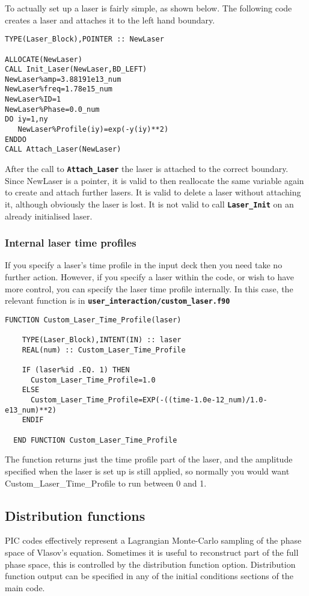 \documentclass[12pt]{article}
\newcommand{\simpleboxverbatim}{\begin{Verbatim}[obeytabs=true,frame=single,
  framerule=0.5mm,rulecolor=\color{warwickmid}]}
\newcommand{\inlinecode}[1]{{\color{warwickred} \bf\texttt{#1}}}
\begin{document}
To actually set up a laser is fairly simple, as shown below. The following
code creates a laser and attaches it to the left hand boundary.
\simpleboxverbatim
TYPE(Laser_Block),POINTER :: NewLaser

ALLOCATE(NewLaser)
CALL Init_Laser(NewLaser,BD_LEFT)
NewLaser%amp=3.88191e13_num
NewLaser%freq=1.78e15_num
NewLaser%ID=1
NewLaser%Phase=0.0_num
DO iy=1,ny
   NewLaser%Profile(iy)=exp(-y(iy)**2)
ENDDO
CALL Attach_Laser(NewLaser)
\end{Verbatim}
After the call to \inlinecode{Attach\_Laser} the laser is attached to the
correct boundary. Since NewLaser is a pointer, it is valid to then reallocate
the same variable again to create and attach further lasers. It is valid to
delete a laser without attaching it, although obviously the laser is lost. It
is not valid to call \inlinecode{Laser\_Init} on an already initialised laser.

\subsubsection{Internal laser time profiles}
If you specify a laser's time profile in the input deck then you need take no
further action. However, if you specify a laser within the code, or wish to
have more control, you can specify the laser time profile internally. In this
case, the relevant function is in
\inlinecode{user\_interaction/custom\_laser.f90}
\simpleboxverbatim
  FUNCTION Custom_Laser_Time_Profile(laser)

    TYPE(Laser_Block),INTENT(IN) :: laser
    REAL(num) :: Custom_Laser_Time_Profile

    IF (laser%
      Custom_Laser_Time_Profile=1.0
    ELSE
      Custom_Laser_Time_Profile=EXP(-((time-1.0e-12_num)/1.0-e13_num)**2)
    ENDIF

  END FUNCTION Custom_Laser_Time_Profile
\end{Verbatim}
The function returns just the time profile part of the laser, and the
amplitude specified when the laser is set up is still applied, so normally you
would want Custom\_Laser\_Time\_Profile to run between 0 and 1.

\subsection{Distribution functions}
PIC codes effectively represent a Lagrangian Monte-Carlo sampling of the phase
space of Vlasov's equation. Sometimes it is useful to reconstruct part of the
full phase space, this is controlled by the distribution function
option.  Distribution function output can
be specified in any of the initial conditions sections of the main code.
\end{document}
